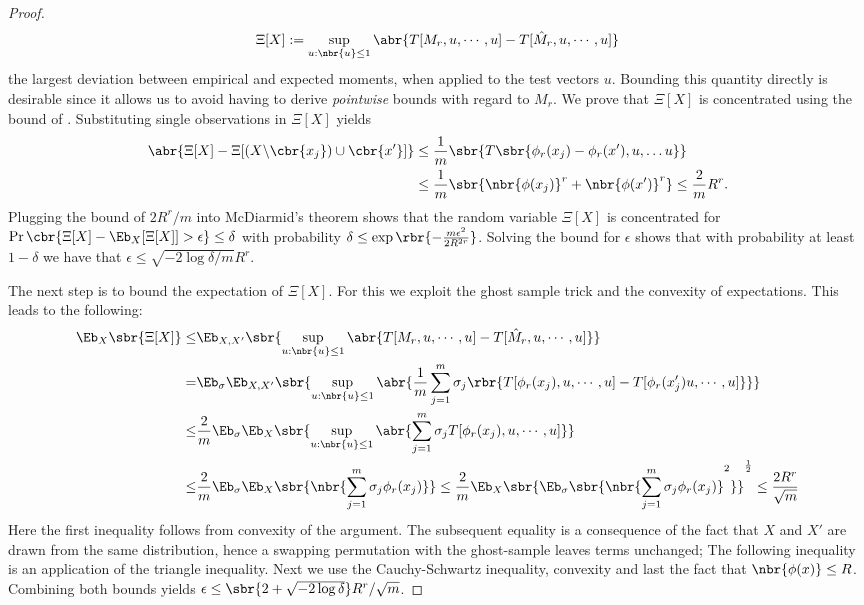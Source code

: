 \documentclass[twoside,11pt]{article}
\begin{document}
{\begin{proof}
\begin{align}
  \label{eq:xi-dev}
  \Xi[X] := \sup_{u: \nbr{u} \leq 1} \abr{T[M_r, u,\cdots, u] -T[\hat{M}_r, u, \cdots, u]}
\end{align}
the largest deviation between empirical and expected moments, when
applied to the test vectors $u$. Bounding this quantity directly is
desirable since it allows us to avoid having to derive
\emph{pointwise} bounds with regard to $M_r$. We prove that 
$\Xi[X]$ is concentrated using the bound of 
\cite{McDiarmid89}. Substituting single observations in $\Xi[X]$ yields
\begin{align}
  \abr{\Xi[X] - \Xi[(X \backslash \cbr{x_j}) \cup \cbr{x'}]} 
  & \leq  \frac{1}{m} \sbr{T\sbr{\phi_r(x_j) - \phi_r(x'), u, \ldots u}} \\ 
  & \leq  \frac{1}{m} \sbr{\nbr{\phi(x_j)}^r + \nbr{\phi(x')}^r} 
  \leq \frac{2}{m} R^r.
\end{align}
Plugging the bound of $2 R^r/m$ into McDiarmid's theorem shows that
the random variable $\Xi[X]$ is concentrated for $\Pr\cbr{\Xi[X] -
  \Eb_{X}[\Xi[X]] > \epsilon} \leq \delta$ with probability $\delta
\leq \exp\rbr{-\frac{m \epsilon^2}{2 R^{2r}}}$. Solving the bound for
$\epsilon$ shows that with probability at least $1-\delta$ we have
that $\epsilon \leq \sqrt{-2 \log \delta/m} R^r$.

The next step is to bound the expectation of $\Xi[X]$. For this we
exploit the ghost sample trick and the convexity of expectations. This
leads to the following:
\begin{align}
  \Eb_{X}\sbr{\Xi[X]} 
  \leq&  \Eb_{X, X'} \sbr{\sup_{u: \nbr{u} \leq 1}
    \abr{T[M_r, u,\cdots, u] -T[\hat{M}_r, u, \cdots, u]}} \nonumber \\
  =&  \Eb_{\sigma} \Eb_{X, X'} \sbr{\sup_{u: \nbr{u} \leq 1}
    \abr{\frac{1}{m} \sum_{j=1}^m \sigma_j \rbr{T[\phi_r(x_j),u,\cdots, u] -
          T[\phi_r(x_j')u,\cdots, u ]}}} \nonumber \\
    \leq & \frac{2}{m} \Eb_{\sigma} \Eb_{X} \sbr{\sup_{u: \nbr{u} \leq 1}
      \abr{\sum_{j=1}^m \sigma_j T[\phi_r(x_j), u,\cdots, u]}} \\
    \leq & \frac{2}{m} \Eb_{\sigma} \Eb_{X} \sbr{\nbr{\sum_{j=1}^m
        \sigma_j \phi_r(x_j)}}
    \leq \frac{2}{m} \Eb_{X} \sbr{\Eb_{\sigma} \sbr{\nbr{\sum_{j=1}^m
        \sigma_j \phi_r(x_j)}^2}}^{\frac{1}{2}} 
  \leq \frac{2 R^r}{\sqrt{m}}
  \end{align}
  Here the first inequality follows from convexity of the
  argument. The subsequent equality is a consequence of the fact that
  $X$ and $X'$ are drawn from the same distribution, hence a swapping
  permutation with the ghost-sample leaves terms unchanged; The
  following inequality is an application of the triangle
  inequality. Next we use the Cauchy-Schwartz inequality, convexity
  and last the fact that $\nbr{\phi(x)} \leq R$. Combining both bounds
  yields $\epsilon \leq \sbr{2 + \sqrt{-2 \log \delta}} R^r/\sqrt{m}$.
\end{proof}

}
\end{document}
